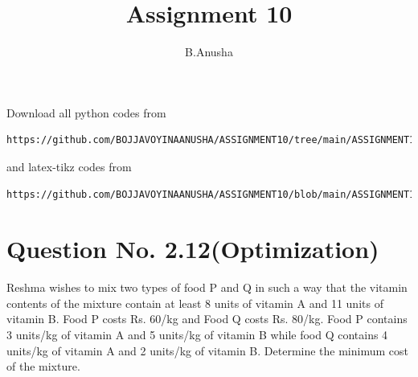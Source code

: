 \documentclass[journal,12pt,twocolumn]{IEEEtran}
\begin{document}
\makeatother
\let\StandardTheFigure\thefigure
\let\vec\mathbf
\renewcommand{\thefigure}{\theproblem}
\def\putbox#1#2#3{\makebox[0in][l]{\makebox[#1][l]{}\raisebox{\baselineskip}[0in][0in]{\raisebox{#2}[0in][0in]{#3}}}}
     \def\rightbox#1{\makebox[0in][r]{#1}}
     \def\centbox#1{\makebox[0in]{#1}}
     \def\topbox#1{\raisebox{-\baselineskip}[0in][0in]{#1}}
     \def\midbox#1{\raisebox{-0.5\baselineskip}[0in][0in]{#1}}
\vspace{3cm}
\title{Assignment 10}
\author{B.Anusha}
\maketitle
\newpage
\bigskip
\renewcommand{\thefigure}{\theenumi}
\renewcommand{\thetable}{\theenumi}
Download all python codes from 
\begin{lstlisting}
https://github.com/BOJJAVOYINAANUSHA/ASSIGNMENT10/tree/main/ASSIGNMENT10/assignment10.py
\end{lstlisting}
%
and latex-tikz codes from 
%
\begin{lstlisting}
https://github.com/BOJJAVOYINAANUSHA/ASSIGNMENT10/blob/main/ASSIGNMENT10/ASSIGNMENT10.tex
\end{lstlisting}
%
\section{Question No. 2.12(Optimization)}
Reshma wishes to mix two types of food P and Q in such a way that the vitamin contents of the mixture contain at least 8 units of vitamin A and 11 units of vitamin B. Food P costs Rs. 60/kg and Food Q costs Rs. 80/kg. Food P contains 3 units/kg of vitamin A and 5 units/kg of vitamin B while food Q contains 4 units/kg of vitamin A and 2 units/kg of vitamin B. Determine the minimum cost of the mixture.
\end{document}
